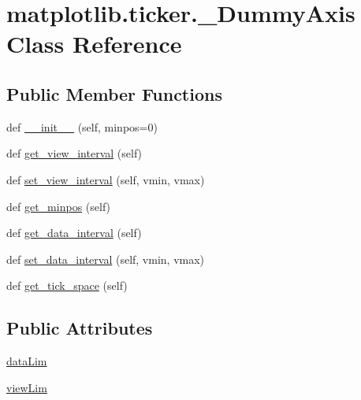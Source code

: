 \hypertarget{classmatplotlib_1_1ticker_1_1__DummyAxis}{}\section{matplotlib.\+ticker.\+\_\+\+Dummy\+Axis Class Reference}
\label{classmatplotlib_1_1ticker_1_1__DummyAxis}
\subsection*{Public Member Functions}
\begin{DoxyCompactItemize}
\item 
def \hyperlink{classmatplotlib_1_1ticker_1_1__DummyAxis_a243b37d5e001a6839e8b8feedb3fd560}{\+\_\+\+\_\+init\+\_\+\+\_\+} (self, minpos=0)
\item 
def \hyperlink{classmatplotlib_1_1ticker_1_1__DummyAxis_ab3b9e7ae11111ec79c345d291d58538a}{get\+\_\+view\+\_\+interval} (self)
\item 
def \hyperlink{classmatplotlib_1_1ticker_1_1__DummyAxis_af4b3193525646f9a6770674cc895bbdc}{set\+\_\+view\+\_\+interval} (self, vmin, vmax)
\item 
def \hyperlink{classmatplotlib_1_1ticker_1_1__DummyAxis_aebe7b294d7d4193470fdcaeca39cab50}{get\+\_\+minpos} (self)
\item 
def \hyperlink{classmatplotlib_1_1ticker_1_1__DummyAxis_a15d071cf9743843eeea219417db81c94}{get\+\_\+data\+\_\+interval} (self)
\item 
def \hyperlink{classmatplotlib_1_1ticker_1_1__DummyAxis_a22ab11510af511cb71fbf27973da886c}{set\+\_\+data\+\_\+interval} (self, vmin, vmax)
\item 
def \hyperlink{classmatplotlib_1_1ticker_1_1__DummyAxis_ae7957d3ea50fd0a7ab1fe7c81c7a5a5e}{get\+\_\+tick\+\_\+space} (self)
\end{DoxyCompactItemize}
\subsection*{Public Attributes}
\begin{DoxyCompactItemize}
\item 
\hyperlink{classmatplotlib_1_1ticker_1_1__DummyAxis_ad0708e5810d9f6ca393cf3d29feb6e1f}{data\+Lim}
\item 
\hyperlink{classmatplotlib_1_1ticker_1_1__DummyAxis_aa3b444e00cf8bc53a9e207ce45d1bc9f}{view\+Lim}
\end{DoxyCompactItemize}


